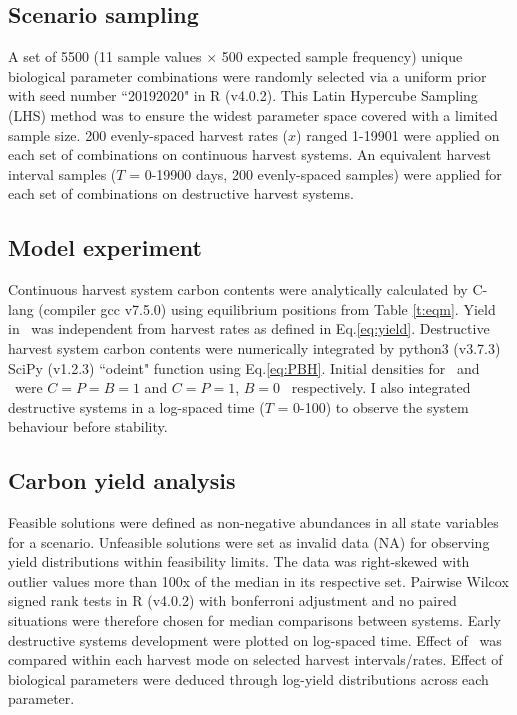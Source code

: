 \documentclass[../thesis.tex]{subfiles} %
\begin{document}
\subsection{Scenario sampling}
A set of 5500 (11 sample values $\times$ 500 expected sample frequency) unique biological parameter combinations were randomly selected via a uniform prior with seed number ``20192020" in R (v4.0.2).  This Latin Hypercube Sampling (LHS) method was to ensure the widest parameter space covered with a limited sample size.  200 evenly-spaced harvest rates ($x$) ranged 1-19901 \dayU were applied on each set of combinations on continuous harvest systems.  An equivalent harvest interval samples ($T$ = 0-19900 days, 200 evenly-spaced samples) were applied for each set of combinations on destructive harvest systems.

\subsection{Model experiment}
Continuous harvest system carbon contents were analytically calculated by C-lang (compiler gcc v7.5.0) using equilibrium positions from Table \ref{t:eqm}. Yield in \PoH\ was independent from harvest rates as defined in Eq.\ref{eq:yield}.  Destructive harvest system carbon contents were numerically integrated by python3 (v3.7.3) SciPy (v1.2.3) ``odeint" function using Eq.\ref{eq:PBH}.  Initial densities for \PBN\ and \PoN\ were $C=P=B=1$ and $C=P=1$, $B=0$ \den\ respectively.  I also integrated destructive systems in a log-spaced time ($T$ = 0-100) to observe the system behaviour before stability.

\subsection{Carbon yield analysis}
Feasible solutions were defined as non-negative abundances in all state variables for a scenario.  Unfeasible solutions were set as invalid data (NA) for observing yield distributions within feasibility limits.  The data was right-skewed with outlier values more than 100x of the median in its respective set.  Pairwise Wilcox signed rank tests in R (v4.0.2) with bonferroni adjustment and no paired situations were therefore chosen for median comparisons between systems.  Early destructive systems development were plotted on log-spaced time.  Effect of \bac\ was compared within each harvest mode on selected harvest intervals/rates.  Effect of biological parameters were deduced through log-yield distributions across each parameter.
\end{document}
